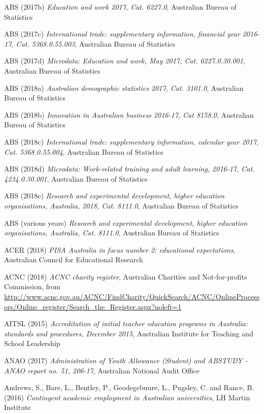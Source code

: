 \documentclass[]{book}
\begin{document}
\protect\hypertarget{_ENREF_5}{}{}ABS (2017b) \emph{Education and work 2017, Cat. 6227.0}, Australian Bureau of Statistics

ABS (2017c) \emph{International trade: supplementary information, financial year 2016-17, Cat. 5368.0.55.003}, Australian Bureau of Statistics

ABS (2017d) \emph{Microdata: Education and work, May 2017, Cat. 6227.0.30.001}, Australian Bureau of Statistics

\protect\hypertarget{_ENREF_8}{}{}ABS (2018a) \emph{Australian demographic statistics 2017, Cat. 3101.0}, Australian Bureau of Statistics

ABS (2018b) \emph{Innovation in Australian business 2016-17, Cat 8158.0}, Australian Bureau of Statistics

ABS (2018c) \emph{International trade: supplementary information, calendar year 2017, Cat. 5368.0.55.004}, Australian Bureau of Statistics

ABS (2018d) \emph{Microdata: Work-related training and adult learning, 2016-17, Cat. 4234.0.30.001}, Australian Bureau of Statistics

\protect\hypertarget{_ENREF_12}{}{}ABS (2018e) \emph{Research and experimental development, higher education organisations, Australia, 2018, Cat. 8111.0}, Australian Bureau of Statistics

\protect\hypertarget{_ENREF_13}{}{}ABS (various years) \emph{Research and experimental development, higher education organisations, Australia, Cat. 8111.0}, Australian Bureau of Statistics

ACER (2018) \emph{PISA Australia in focus number 2: educational expectations}, Australian Council for Educational Research

ACNC (2018) \emph{ACNC charity register}, Australian Charities and Not-for-profits Commission, from \url{http://www.acnc.gov.au/ACNC/FindCharity/QuickSearch/ACNC/OnlineProcessors/Online_register/Search_the_Register.aspx?noleft=1}

AITSL (2015) \emph{Accreditation of initial teacher education programs in Australia: standards and procedures, December 2015}, Australian Institute for Teaching and School Leadership

ANAO (2017) \emph{Administration of Youth Allowance (Student) and ABSTUDY - ANAO report no. 51, 206-17}, Australian National Audit Office

Andrews, S., Bare, L., Bentley, P., Geodegebuure, L., Pugsley, C. and Rance, B. (2016) \emph{Contingent academic employment in Australian universities}, LH Martin Institute
\end{document}
